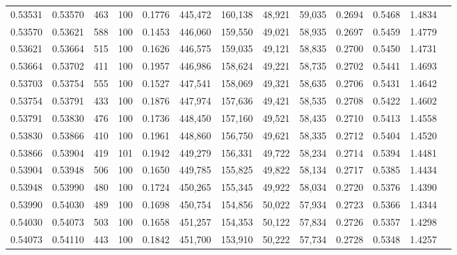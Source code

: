 \begin{tabular}{rrrrrrrrrrrrr}
0.53531 & 0.53570 &   463 & 100 &                                     0.1776 & 445,472 & 160,138 &  48,921 &  59,035 & 0.2694 & 0.5468 & 1.4834 \\
0.53570 & 0.53621 &   588 & 100 &                                     0.1453 & 446,060 & 159,550 &  49,021 &  58,935 & 0.2697 & 0.5459 & 1.4779 \\
0.53621 & 0.53664 &   515 & 100 &                                     0.1626 & 446,575 & 159,035 &  49,121 &  58,835 & 0.2700 & 0.5450 & 1.4731 \\
0.53664 & 0.53702 &   411 & 100 &                                     0.1957 & 446,986 & 158,624 &  49,221 &  58,735 & 0.2702 & 0.5441 & 1.4693 \\
0.53703 & 0.53754 &   555 & 100 &                                     0.1527 & 447,541 & 158,069 &  49,321 &  58,635 & 0.2706 & 0.5431 & 1.4642 \\
0.53754 & 0.53791 &   433 & 100 &                                     0.1876 & 447,974 & 157,636 &  49,421 &  58,535 & 0.2708 & 0.5422 & 1.4602 \\
0.53791 & 0.53830 &   476 & 100 &                                     0.1736 & 448,450 & 157,160 &  49,521 &  58,435 & 0.2710 & 0.5413 & 1.4558 \\
0.53830 & 0.53866 &   410 & 100 &                                     0.1961 & 448,860 & 156,750 &  49,621 &  58,335 & 0.2712 & 0.5404 & 1.4520 \\
0.53866 & 0.53904 &   419 & 101 &                                     0.1942 & 449,279 & 156,331 &  49,722 &  58,234 & 0.2714 & 0.5394 & 1.4481 \\
0.53904 & 0.53948 &   506 & 100 &                                     0.1650 & 449,785 & 155,825 &  49,822 &  58,134 & 0.2717 & 0.5385 & 1.4434 \\
0.53948 & 0.53990 &   480 & 100 &                                     0.1724 & 450,265 & 155,345 &  49,922 &  58,034 & 0.2720 & 0.5376 & 1.4390 \\
0.53990 & 0.54030 &   489 & 100 &                                     0.1698 & 450,754 & 154,856 &  50,022 &  57,934 & 0.2723 & 0.5366 & 1.4344 \\
0.54030 & 0.54073 &   503 & 100 &                                     0.1658 & 451,257 & 154,353 &  50,122 &  57,834 & 0.2726 & 0.5357 & 1.4298 \\
0.54073 & 0.54110 &   443 & 100 &                                     0.1842 & 451,700 & 153,910 &  50,222 &  57,734 & 0.2728 & 0.5348 & 1.4257 \\

\end{tabular}
